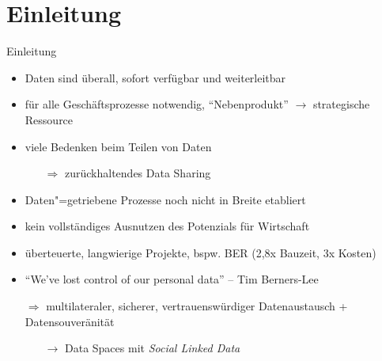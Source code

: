 
{
    \section{Einleitung}
}

\begin{frame}{Einleitung}
    \begin{itemize}
        \item Daten sind überall, sofort verfügbar und weiterleitbar
        \item für alle Geschäftsprozesse notwendig, \enquote{Nebenprodukt} $\to$ strategische Ressource~\cite{mollerIndustrialDataEcosystems2024}
        
        \pause
        \item viele Bedenken beim Teilen von Daten~\cite{mollerIndustrialDataEcosystems2024}
        \begin{itemize}
            
            \pause
            \item[$\Rightarrow$] zurückhaltendes Data Sharing
        \end{itemize}

        \pause
        \item Daten"=getriebene Prozesse noch nicht in Breite etabliert
        \item kein vollständiges Ausnutzen des Potenzials für Wirtschaft

        \pause
        \item überteuerte, langwierige Projekte, bspw. BER (2,8x Bauzeit, 3x Kosten)~\cite{stalinskiBestBERZahlen2020}
        
        \pause
        \item \enquote{We've \alert{lost control} of our personal data} -- Tim Berners-Lee~\cite{berners-leeThreeChallengesWeb2017}
        
        \pause
        \item[$\Rightarrow$] multilateraler, sicherer, vertrauenswürdiger Datenaustausch + Datensouveränität~\cite{mollerIndustrialDataEcosystems2024}
        \pause
        \begin{itemize}
            \item[$\to$] Data Spaces mit \emph{Social Linked Data}~\cite{mecklerWebLinkedData2023}
        \end{itemize}
    \end{itemize}
\end{frame}

